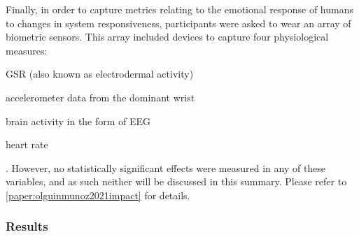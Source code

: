 Finally, in order to capture metrics relating to the emotional response of humans to changes in system responsiveness, participants were asked to wear an array of biometric sensors.
This array included devices to capture four physiological measures:
\begin{enumerate*}[itemjoin={{, }}, itemjoin*={{, and }}, label={(\arabic*)}]
    \item \gls{GSR} (also known as electrodermal activity)
    \item accelerometer data from the dominant wrist
    \item brain activity in the form of \gls{EEG}
    \item heart rate
\end{enumerate*}.
However, no statistically significant effects were measured in any of these variables, and as such neither will be discussed in this summary.
Please refer to \cref{paper:olguinmunoz2021impact} for details.

\subsubsection{Results}\label{impact:results}

